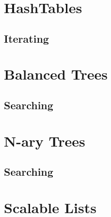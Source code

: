 \section{HashTables}
\subsection{Iterating}

\section{Balanced Trees}
\subsection{Searching}

\section{N-ary Trees}
\subsection{Searching}

\section{Scalable Lists}
